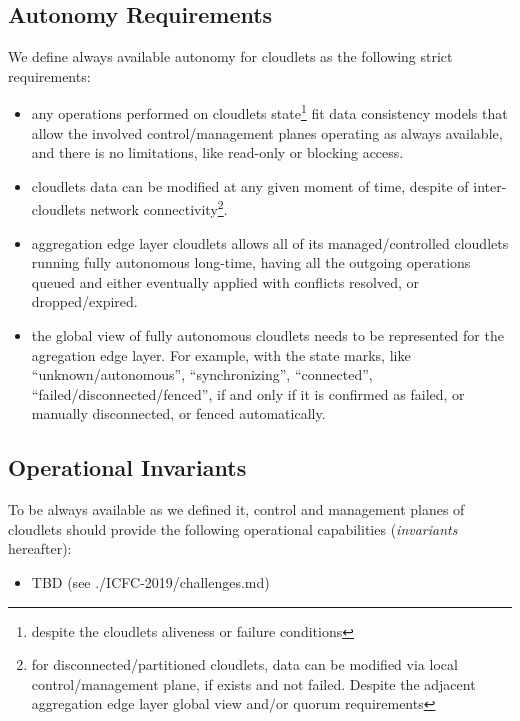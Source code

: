 \documentclass[conference]{IEEEtran}
\begin{document}
\subsection{Autonomy Requirements}

We define always available autonomy for cloudlets as the following strict
requirements:

\begin{itemize}
  \item any operations performed on cloudlets state\footnote{despite the
    cloudlets aliveness or failure conditions} fit data consistency models that
    allow the involved control/management planes operating as always available,
    and there is no limitations, like read-only or blocking access.
  \item cloudlets data can be modified at any given moment of time, despite of
    inter-cloudlets network connectivity\footnote{for disconnected/partitioned
    cloudlets, data can be modified via local control/management plane, if
    exists and not failed. Despite the adjacent aggregation edge
    layer global view and/or quorum requirements}.
  \item aggregation edge layer cloudlets allows all of its managed/controlled
    cloudlets running fully autonomous long-time, having all the outgoing
    operations queued and either eventually applied with conflicts resolved, or
    dropped/expired.
  \item the global view of fully autonomous cloudlets needs to be represented
    for the agregation edge layer. For example, with the state marks, like
    ``unknown/autonomous'', ``synchronizing'', ``connected'',
    ``failed/disconnected/fenced'', if and only if it is confirmed as failed,
    or manually disconnected, or fenced automatically.
\end{itemize}

\subsection{Operational Invariants}

To be always available as we defined it, control and management planes of
cloudlets should provide the following operational capabilities
(\textit{invariants} hereafter):

\begin{itemize}
  \item TBD (see ./ICFC-2019/challenges.md)
\end{itemize}
\end{document}
